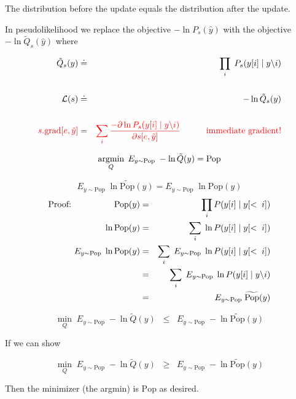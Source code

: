 {\vfill
The distribution before the update equals the distribution after the update.


In pseudolikelihood we replace the objective $- \ln P_s(\hat{y})$ with the objective $- \ln \tilde{Q}_s(\hat{y})$ where

\vfill
\begin{eqnarray*}
  \tilde{Q}_s(y) & \doteq & \prod_i \;P_s(y[i] \;|\;y\backslash i) \\
  \\
  {\cal L}(s) & \doteq & - \ln \tilde{Q}_s(y) \\
  \\
  {\color{red} s.\mathrm{grad}[e,\tilde{y}]} & = & {\color{red} \sum_i \frac{- \partial \ln P_s(y[i] \;|\;y\backslash i)}{\partial s[e,\tilde{y}]}
  \hspace{3em} \mbox{immediate gradient!}}
\end{eqnarray*}



$$\operatorname*{argmin}_Q \; E_{y \sim \mathrm{Pop}} \;-\ln \tilde{Q}(y) = \mathrm{Pop}$$

\vfill


{\color{red} $$E_{y \sim \mathrm{Pop}}\;\ln \widetilde{\mathrm{Pop}}(y) = E_{y \sim \mathrm{Pop}}\;\ln \mathrm{Pop}(y)$$}
{\huge
\begin{eqnarray*}
\mbox{Proof:}\hspace{5em}\mathrm{Pop}(y) & = & \prod_i P(y[i]\;|\; y[<\;i]) \\
\ln \mathrm{Pop}(y) & = & \sum_i \; \ln P(y[i]\;|\; y[<\;i]) \\
E_{y \sim \mathrm{Pop}}\;\ln \mathrm{Pop}(y) & = & \sum_i \;E_{y \sim \mathrm{Pop}} \; \ln P(y[i]\;|\; y[<\;i]) \\
& = & \sum_i \;E_{y \sim \mathrm{Pop}} \;\ln P(y[i]\;|\; y\backslash i) \\
& = & E_{y\sim \mathrm{Pop}}\;\widetilde{\mathrm{Pop}}(y)
\end{eqnarray*}
}

$$\min_{Q} \;E_{y \sim \mathrm{Pop}}\;-\ln \tilde{Q}(y) \;\;\leq \;\; E_{y \sim \mathrm{Pop}}\;-\ln \widetilde{\mathrm{Pop}}(y)$$

\vfill
If we can show

$$\min_{Q} \;E_{y \sim \mathrm{Pop}}\;-\ln \tilde{Q}(y) \;\;\geq \;\; E_{y \sim \mathrm{Pop}}\;-\ln \widetilde{\mathrm{Pop}}(y)$$

Then the minimizer (the argmin) is $\mathrm{Pop}$ as desired.

}

